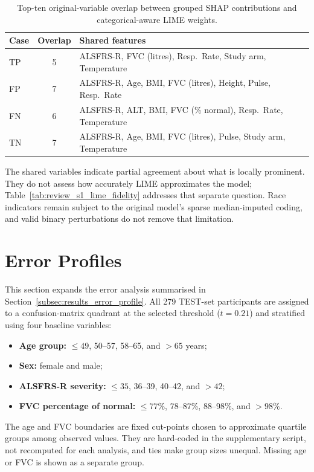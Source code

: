 \begin{table}[ht!]
\centering
\caption[SHAP--LIME top-10 feature overlap]{Top-ten original-variable overlap between grouped SHAP contributions and categorical-aware LIME weights.}
\label{tab:concordance}
\small
\begin{tabular}{l c l}
\toprule
\textbf{Case} & \textbf{Overlap} & \textbf{Shared features} \\
\midrule
TP & 5 & ALSFRS-R, FVC (litres), Resp.\ Rate, Study arm, Temperature \\
FP & 7 & ALSFRS-R, Age, BMI, FVC (litres), Height, Pulse, Resp.\ Rate \\
FN & 6 & ALSFRS-R, ALT, BMI, FVC (\% normal), Resp.\ Rate, Temperature \\
TN & 7 & ALSFRS-R, Age, BMI, FVC (litres), Pulse, Study arm, Temperature \\
\bottomrule
\end{tabular}
\end{table}

The shared variables indicate partial agreement about what is locally prominent. They do not assess how accurately LIME approximates the model; Table~\ref{tab:review_s1_lime_fidelity} addresses that separate question. Race indicators remain subject to the original model's sparse median-imputed coding, and valid binary perturbations do not remove that limitation.


\section{Error Profiles}
\label{app:error_profiles}

This section expands the error analysis summarised in Section~\ref{subsec:results_error_profile}. All 279 \gls{TEST}-set participants are assigned to a confusion-matrix quadrant at the selected threshold ($t=0.21$) and stratified using four baseline variables:
\begin{itemize}
  \item \textbf{Age group:} $\leq49$, 50--57, 58--65, and $>65$ years;
  \item \textbf{Sex:} female and male;
  \item \textbf{\gls{ALSFRS-R} severity:} $\leq35$, 36--39, 40--42, and $>42$;
  \item \textbf{\gls{FVC} percentage of normal:} $\leq77\%$, 78--87\%, 88--98\%, and $>98\%$.
\end{itemize}
The age and \gls{FVC} boundaries are fixed cut-points chosen to approximate quartile groups among observed values. They are hard-coded in the supplementary script, not recomputed for each analysis, and ties make group sizes unequal. Missing age or FVC is shown as a separate group.

